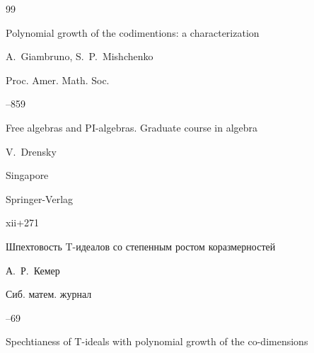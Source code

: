 \begin{thebibliography}{99}






\paper Polynomial growth  of the codimentions: a characterization

\by A.~Giambruno, S.~P.~Mishchenko

\jour Proc. Amer. Math. Soc.




--859









\book Free algebras and PI-algebras. Graduate course in algebra

\by V.~Drensky

\publaddr Singapore

\publ Springer-Verlag


\totalpages xii+271






\paper Шпехтовость T-идеалов со степенным ростом коразмерностей

\by А.~Р.~Кемер

\jour Сиб. матем. журнал




--69



\misctransl

\paper Spechtianess of T-ideals with polynomial growth of the co-dimensions


\end{thebibliography}
